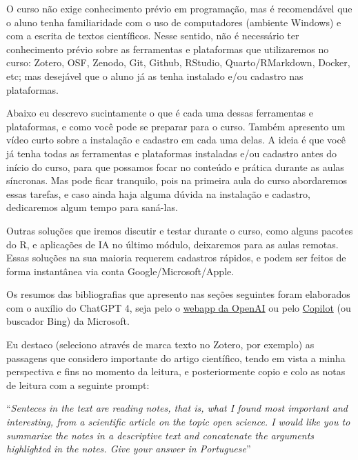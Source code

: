 \documentclass[
  a4paper,
]{article}
\begin{document}

O curso não exige conhecimento prévio em programação, mas é recomendável
que o aluno tenha familiaridade com o uso de computadores (ambiente
Windows) e com a escrita de textos científicos. Nesse sentido, não é
necessário ter conhecimento prévio sobre as ferramentas e plataformas
que utilizaremos no curso: Zotero, OSF, Zenodo, Git, Github, RStudio,
Quarto/RMarkdown, Docker, etc; mas desejável que o aluno já as tenha
instalado e/ou cadastro nas plataformas.

Abaixo eu descrevo sucintamente o que é cada uma dessas ferramentas e
plataformas, e como você pode se preparar para o curso. Também apresento
um vídeo curto sobre a instalação e cadastro em cada uma delas. A ideia
é que você já tenha todas as ferramentas e plataformas instaladas e/ou
cadastro antes do início do curso, para que possamos focar no conteúdo e
prática durante as aulas síncronas. Mas pode ficar tranquilo, pois na
primeira aula do curso abordaremos essas tarefas, e caso ainda haja
alguma dúvida na instalação e cadastro, dedicaremos algum tempo para
saná-las.

Outras soluções que iremos discutir e testar durante o curso, como
alguns pacotes do R, e aplicações de IA no último módulo, deixaremos
para as aulas remotas. Essas soluções na sua maioria requerem cadastros
rápidos, e podem ser feitos de forma instantânea via conta
Google/Microsoft/Apple.

\begin{tcolorbox}[enhanced jigsaw, rightrule=.15mm, leftrule=.75mm, opacityback=0, toprule=.15mm, breakable, toptitle=1mm, colframe=quarto-callout-important-color-frame, colbacktitle=quarto-callout-important-color!10!white, coltitle=black, colback=white, bottomtitle=1mm, titlerule=0mm, left=2mm, bottomrule=.15mm, arc=.35mm, title=\textcolor{quarto-callout-important-color}{\faExclamation}\hspace{0.5em}{ChatGPT para suas notas de leituras}, opacitybacktitle=0.6]

Os resumos das bibliografias que apresento nas seções seguintes foram
elaborados com o auxílio do ChatGPT 4, seja pelo o
\href{https://chat.openai.com/}{webapp da OpenAI} ou pelo
\href{https://copilot.microsoft.com/}{Copilot} (ou buscador Bing) da
Microsoft.

Eu destaco (seleciono através de marca texto no Zotero, por exemplo) as
passagens que considero importante do artigo científico, tendo em vista
a minha perspectiva e fins no momento da leitura, e posteriormente copio
e colo as notas de leitura com a seguinte prompt:

``\emph{Senteces in the text are reading notes, that is, what I found
most important and interesting, from a scientific article on the topic
open science. I would like you to summarize the notes in a descriptive
text and concatenate the arguments highlighted in the notes. Give your
answer in Portuguese}''

\end{tcolorbox}
\end{document}
